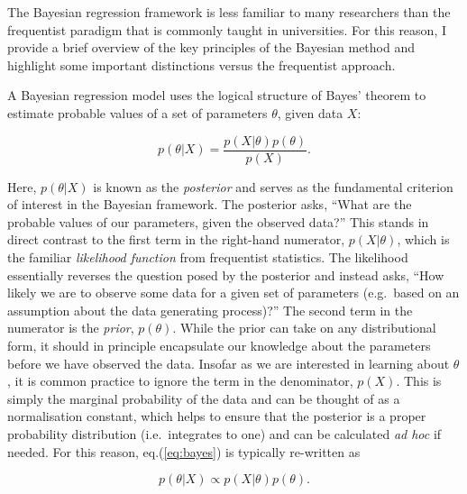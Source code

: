 \documentclass[smallextended]{svjour3}       %
\begin{document}
The Bayesian regression framework is less familiar to many researchers
than the frequentist paradigm that is commonly taught in universities.
For this reason, I provide a brief overview of the key principles of the
Bayesian method and highlight some important distinctions versus the
frequentist approach.

A Bayesian regression model uses the logical structure of Bayes' theorem
to estimate probable values of a set of parameters \(\theta\), given
data \(X\):

\begin{equation}
    p(\theta|X) = \frac{p(X|\theta)p(\theta)}{p(X)}. \label{eq:bayes}
\end{equation}

Here, \(p(\theta|X)\) is known as the \textit{posterior} and serves as
the fundamental criterion of interest in the Bayesian framework. The
posterior asks, ``What are the probable values of our parameters, given
the observed data?'' This stands in direct contrast to the first term in
the right-hand numerator, \(p(X|\theta)\), which is the familiar
\textit{likelihood function} from frequentist statistics. The likelihood
essentially reverses the question posed by the posterior and instead
asks, ``How likely we are to observe some data for a given set of
parameters (e.g.~based on an assumption about the data generating
process)?'' The second term in the numerator is the \textit{prior},
\(p(\theta)\). While the prior can take on any distributional form, it
should in principle encapsulate our knowledge about the parameters
before we have observed the data. Insofar as we are interested in
learning about \(\theta\), it is common practice to ignore the term in
the denominator, \(p(X)\). This is simply the marginal probability of
the data and can be thought of as a normalisation constant, which helps
to ensure that the posterior is a proper probability distribution
(i.e.~integrates to one) and can be calculated \textit{ad hoc} if
needed. For this reason, eq.(\ref{eq:bayes}) is typically re-written as

\begin{equation}
    p(\theta|X) \propto p(X|\theta)p(\theta). \label{eq:bayesprop}
\end{equation}
\end{document}

